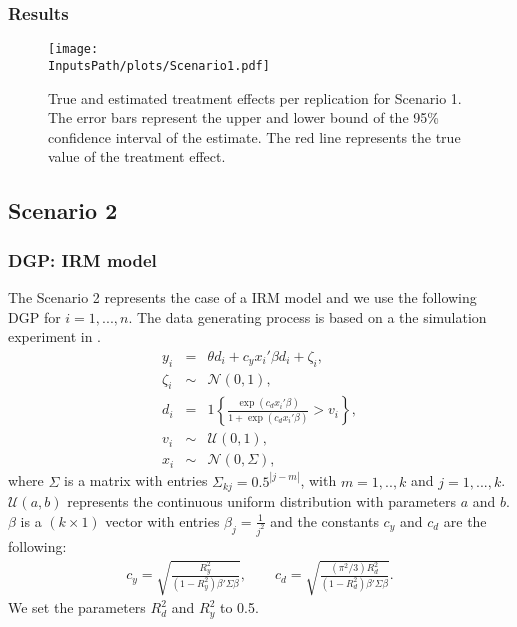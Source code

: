 \documentclass[10pt]{article}
\newcommand*{\InputsFolderPath}{C:/DEV/DML/src/data/}
\newcommand*{\InputsPath}{\InputsFolderPath/20221107}
\begin{document}
\subsubsection{Results}

\begin{figure}[H]
	\begin{center}
		\texttt{[image: \\InputsPath/plots/Scenario1.pdf]}
		\caption{True and estimated treatment effects per replication for Scenario 1. The error bars represent the upper and lower bound of the 95\% confidence interval of the estimate. The red line represents the true value of the treatment effect.}
		\label{Scenario 1}
	\end{center}
\end{figure}



\subsection{Scenario 2}
\subsubsection{DGP: IRM model}
The Scenario 2 represents the case of a IRM model and we use the following DGP for $i=1,...,n$.
The data generating process is based on a the simulation experiment in \cite{Bell2017}.
\begin{eqnarray*}\label{dgp_3.1}
	y_i &=& \theta d_i + c_y x_i' \beta d_i + \zeta_i, \\
	\zeta_i &\sim& \mathcal{N}(0,1), \\	
	d_i &=& 1\left\lbrace \frac{\exp(c_d x_i' \beta)}{1+\exp(c_d x_i' \beta)} > v_i \right\rbrace, \\
	v_i
	&\sim& \mathcal{U}(0,1),\\
	x_i &\sim& \mathcal{N}(0, \Sigma),
\end{eqnarray*}
where $\Sigma$ is a matrix with entries $\Sigma_{kj} = 0.5^{|j-m|}$, with $m=1,..,k$ and $j=1,...,k$.
$\mathcal{U}(a,b)$ represents the continuous uniform distribution with parameters $a$ and $b$.
$\beta$ is a $(k\times 1)$ vector with entries $\beta_j=\frac{1}{j^2}$ and the constants $c_y$ and $c_d$ are the following:
\begin{eqnarray*}\label{dgp_3.2}
	c_y = \sqrt{\frac{R_y^2}{(1-R_y^2) \beta' \Sigma \beta}}, \qquad 
	c_d =\sqrt{\frac{(\pi^2 /3) R_d^2}{(1-R_d^2) \beta' \Sigma \beta}}.
\end{eqnarray*}
We set the parameters $R^2_d$ and $R^2_y$ to 0.5.
\end{document}
